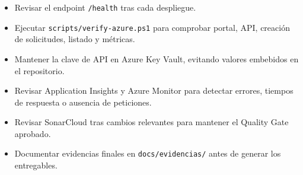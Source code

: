 \begin{itemize}
    \item Revisar el endpoint \texttt{/health} tras cada despliegue.
    \item Ejecutar \texttt{scripts/verify-azure.ps1} para comprobar portal, API, creación de solicitudes, listado y métricas.
    \item Mantener la clave de API en Azure Key Vault, evitando valores embebidos en el repositorio.
    \item Revisar Application Insights y Azure Monitor para detectar errores, tiempos de respuesta o ausencia de peticiones.
    \item Revisar SonarCloud tras cambios relevantes para mantener el Quality Gate aprobado.
    \item Documentar evidencias finales en \texttt{docs/evidencias/} antes de generar los entregables.
\end{itemize}
